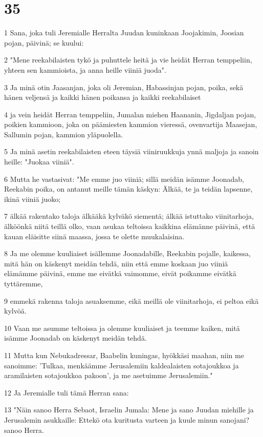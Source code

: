 \chapter{35}

\par 1 Sana, joka tuli Jeremialle Herralta Juudan kuninkaan Joojakimin, Joosian pojan, päivinä; se kuului:
\par 2 "Mene reekabilaisten tykö ja puhuttele heitä ja vie heidät Herran temppeliin, yhteen sen kammioista, ja anna heille viiniä juoda".
\par 3 Ja minä otin Jaasanjan, joka oli Jeremian, Habassinjan pojan, poika, sekä hänen veljensä ja kaikki hänen poikansa ja kaikki reekabilaiset
\par 4 ja vein heidät Herran temppeliin, Jumalan miehen Haananin, Jigdaljan pojan, poikien kammioon, joka on päämiesten kammion vieressä, ovenvartija Maasejan, Sallumin pojan, kammion yläpuolella.
\par 5 Ja minä asetin reekabilaisten eteen täysiä viiniruukkuja ynnä maljoja ja sanoin heille: "Juokaa viiniä".
\par 6 Mutta he vastasivat: "Me emme juo viiniä; sillä meidän isämme Joonadab, Reekabin poika, on antanut meille tämän käskyn: Älkää, te ja teidän lapsenne, ikinä viiniä juoko;
\par 7 älkää rakentako taloja älkääkä kylväkö siementä; älkää istuttako viinitarhoja, älköönkä niitä teillä olko, vaan asukaa teltoissa kaikkina elämänne päivinä, että kauan eläisitte siinä maassa, jossa te olette muukalaisina.
\par 8 Ja me olemme kuuliaiset isällemme Joonadabille, Reekabin pojalle, kaikessa, mitä hän on käskenyt meidän tehdä, niin että emme koskaan juo viiniä elämämme päivinä, emme me eivätkä vaimomme, eivät poikamme eivätkä tyttäremme,
\par 9 emmekä rakenna taloja asuaksemme, eikä meillä ole viinitarhoja, ei peltoa eikä kylvöä.
\par 10 Vaan me asumme teltoissa ja olemme kuuliaiset ja teemme kaiken, mitä isämme Joonadab on käskenyt meidän tehdä.
\par 11 Mutta kun Nebukadressar, Baabelin kuningas, hyökkäsi maahan, niin me sanoimme: 'Tulkaa, menkäämme Jerusalemiin kaldealaisten sotajoukkoa ja aramilaisten sotajoukkoa pakoon', ja me asetuimme Jerusalemiin."
\par 12 Ja Jeremialle tuli tämä Herran sana:
\par 13 "Näin sanoo Herra Sebaot, Israelin Jumala: Mene ja sano Juudan miehille ja Jerusalemin asukkaille: Ettekö ota kuritusta varteen ja kuule minun sanojani? sanoo Herra.
